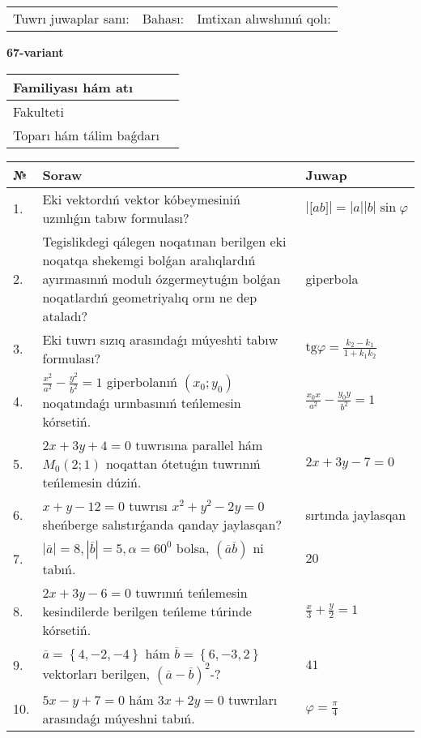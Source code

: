 \documentclass{article}
\begin{document}
\vspace{1cm}

\begin{tabular}{lll}
Tuwrı juwaplar sanı: \underline{\hspace{1.5cm}} & 
Bahası: \underline{\hspace{1.5cm}} & 
Imtixan alıwshınıń qolı: \underline{\hspace{2cm}} \\
\end{tabular}

\egroup

\newpage


\textbf{67-variant}\\

\bgroup
\def\arraystretch{1.6} %

\begin{tabular}{|m{5.7cm}|m{9.5cm}|}
\hline
Familiyası hám atı & \\
\hline
Fakulteti  & \\
\hline
Toparı hám tálim baǵdarı  & \\
\hline
\end{tabular}

\vspace{1cm}

\begin{tabular}{|m{0.7cm}|m{10cm}|m{4cm}|}
\hline
№ & Soraw & Juwap \\
\hline
1. & Eki vektordıń vektor kóbeymesiniń uzınlıǵın tabıw formulası? & $\left| \lbrack ab\rbrack \right|=|a||b|\sin\varphi$ \\
\hline
2. & Tegislikdegi qálegen noqatınan berilgen eki noqatqa shekemgi bolǵan aralıqlardıń ayırmasınıń modulı ózgermeytuǵın bolǵan noqatlardıń geometriyalıq ornı ne dep ataladı? & giperbola \\
\hline
3. & Eki tuwrı sızıq arasındaǵı múyeshti tabıw formulası? & $\text{tg}\varphi=\frac{k_2-k_1}{1+k_1k_2}$ \\
\hline
4. & $\frac{x^2}{a^2}-\frac{y^2}{b^2}=1$ giperbolanıń $(x_0;y_0)$ noqatındaǵı urınbasınıń teńlemesin kórsetiń. & $\frac{x_0x}{a^2}-\frac{y_0y}{b^2}=1$ \\
\hline
5. & $2x+3y+4=0$ tuwrısına parallel hám $M_{0} (2;1)$ noqattan ótetuǵın tuwrınıń teńlemesin dúziń. & $2x+3y-7=0$ \\
\hline
6. & $x+y-12=0$ tuwrısı $x^{2}+y^{2}-2y=0$ sheńberge salıstırǵanda qanday jaylasqan? & sırtında jaylasqan \\
\hline
7. & $\left| \overline{a} \right|=8, \left| \overline{b} \right|=5, \alpha=60^{0}$ bolsa, $( \overline{a}\overline{b} )$ ni tabıń. & $20$ \\
\hline
8. & $2x+3y-6=0$ tuwrınıń teńlemesin kesindilerde berilgen teńleme túrinde kórsetiń. & $\frac{x}{3} + \frac{ y }{ 2 } =  1$ \\
\hline
9. & $\overline{a}=\left\{ 4,-2,-4 \right\}$ hám $\overline{b}=\left\{ 6,-3, 2 \right\}$ vektorları berilgen, $(\overline{a}-\overline{b}) ^{2}$-? & $41$ \\
\hline
10. & $5x-y+7=0$ hám $3x+2y=0$ tuwrıları arasındaǵı múyeshni tabıń. & $\varphi=\frac{\pi}{4}$ \\
\hline
\end{tabular}
\end{document}
